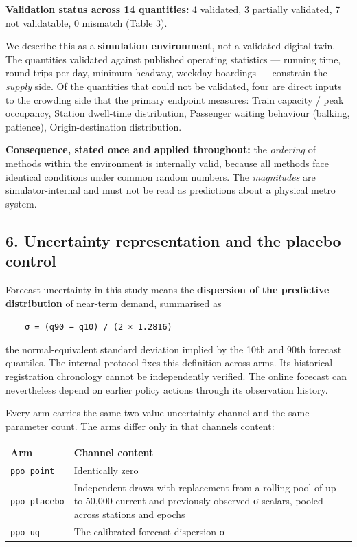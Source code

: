 \documentclass[
]{article}
\begin{document}
\textbf{Validation status across 14 quantities:} 4 validated, 3
partially validated, 7 not validatable, 0 mismatch (Table 3).

We describe this as a \textbf{simulation environment}, not a validated
digital twin. The quantities validated against published operating
statistics --- running time, round trips per day, minimum headway,
weekday boardings --- constrain the \emph{supply} side. Of the
quantities that could not be validated, four are direct inputs to the
crowding side that the primary endpoint measures: Train capacity / peak
occupancy, Station dwell-time distribution, Passenger waiting behaviour
(balking, patience), Origin-destination distribution.

\textbf{Consequence, stated once and applied throughout:} the
\emph{ordering} of methods within the environment is internally valid,
because all methods face identical conditions under common random
numbers. The \emph{magnitudes} are simulator-internal and must not be
read as predictions about a physical metro system.

\subsection{6. Uncertainty representation and the placebo
control}\label{6-uncertainty-representation-and-the-placebo-control}

Forecast uncertainty in this study means the \textbf{dispersion of the
predictive distribution} of near-term demand, summarised as

~~~~\texttt{σ\ =\ (q90\ −\ q10)\ /\ (2\ ×\ 1.2816)}

the normal-equivalent standard deviation implied by the 10th and 90th
forecast quantiles. The internal protocol fixes this definition across
arms. Its historical registration chronology cannot be independently
verified. The online forecast can nevertheless depend on earlier policy
actions through its observation history.

Every arm carries the same two-value uncertainty channel and the same
parameter count. The arms differ only in that channel\textquotesingle s
content:

\begin{longtable}[]{@{}ll@{}}
\toprule\noalign{}
Arm & Channel content \\
\midrule\noalign{}
\endhead
\bottomrule\noalign{}
\endlastfoot
\texttt{ppo\_point} & Identically zero \\
\texttt{ppo\_placebo} & Independent draws with replacement from a
rolling pool of up to 50,000 current and previously observed σ scalars,
pooled across stations and epochs \\
\texttt{ppo\_uq} & The calibrated forecast dispersion σ \\
\end{longtable}
\end{document}
